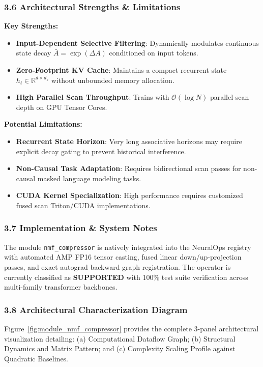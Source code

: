 \subsubsection*{3.6 Architectural Strengths \& Limitations}
\textbf{Key Strengths:}
\begin{itemize}
    \item \textbf{Input-Dependent Selective Filtering}: Dynamically modulates continuous state decay $\bar{A} = \exp(\Delta A)$ conditioned on input tokens.
    \item \textbf{Zero-Footprint KV Cache}: Maintains a compact recurrent state $h_t \in \mathbb{R}^{d \times d_s}$ without unbounded memory allocation.
    \item \textbf{High Parallel Scan Throughput}: Trains with $\mathcal{O}(\log N)$ parallel scan depth on GPU Tensor Cores.
\end{itemize}

\textbf{Potential Limitations:}
\begin{itemize}
    \item \textbf{Recurrent State Horizon}: Very long associative horizons may require explicit decay gating to prevent historical interference.
    \item \textbf{Non-Causal Task Adaptation}: Requires bidirectional scan passes for non-causal masked language modeling tasks.
    \item \textbf{CUDA Kernel Specialization}: High performance requires customized fused scan Triton/CUDA implementations.
\end{itemize}

\subsubsection*{3.7 Implementation \& System Notes}
The module \texttt{nmf\_compressor} is natively integrated into the NeuralOps registry with automated AMP FP16 tensor casting, fused linear down/up-projection passes, and exact autograd backward graph registration. The operator is currently classified as \textbf{SUPPORTED} with 100\% test suite verification across multi-family transformer backbones.

\subsubsection*{3.8 Architectural Characterization Diagram}
Figure~\ref{fig:module_nmf_compressor} provides the complete 3-panel architectural visualization detailing: (a) Computational Dataflow Graph; (b) Structural Dynamics and Matrix Pattern; and (c) Complexity Scaling Profile against Quadratic Baselines.

